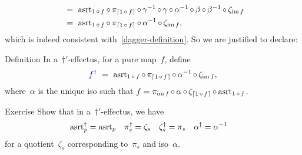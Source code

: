 \documentclass[b]{subfiles}
\begin{document}
\begin{parsec}
\begin{point}
\begin{align*}
    &\ = \ \mathrm{asrt}_{1 \mathop{\circ} f}\mathop{\circ} \pi_{\left\lceil1 \mathop{\circ} f\right\rceil}
                \mathop{\circ} \gamma^{-1} \mathop{\circ} \gamma \mathop{\circ} \alpha^{-1} \mathop{\circ} \beta 
                \mathop{\circ} \beta^{-1}\mathop{\circ} \zeta_{\operatorname{im} f} \\
    &\ = \ \mathrm{asrt}_{1 \mathop{\circ} f}\mathop{\circ} \pi_{\left\lceil1 \mathop{\circ} f\right\rceil}
                \mathop{\circ} \alpha^{-1} \mathop{\circ} \zeta_{\operatorname{im} f},
\end{align*}
which is indeed consistent with~\eqref{dagger-definition}.
So we are justified to declare:
\end{point}
\begin{point}{Definition}%
In a~$\dagger'$-effectus, for a pure map~$f$, define
\begin{equation*}
    \Define{f^\dagger}
        \ =\  \asrt_{1 \after f} \after
    \pi_{\ceil{1\after f}} \after
    \alpha^{-1} \after
    \zeta_{\IM f},
\end{equation*}
where~$\alpha$ is the unique iso such that
$f  =  \pi_{\operatorname{im} f} \mathop{\circ} \alpha \mathop{\circ} \zeta_{\left\lceil1\mathop{\circ} f\right\rceil}
            \mathop{\circ} \mathrm{asrt}_{1 \mathop{\circ} f}$.
\end{point}
\begin{point}{Exercise}%
Show that in a~$\dagger'$-effectus,
    we have
\begin{align*}
    \mathrm{asrt}_p^\dagger &= \mathrm{asrt}_p &
    \pi_s^\dagger &= \zeta_s &
    \zeta_s^\dagger &= \pi_s &
    \alpha^\dagger &= \alpha^{-1}
\end{align*}
for a quotient~$\zeta_s$ corresponding to~$\pi_s$
and iso~$\alpha$.
\end{point}
\end{parsec}
\end{document}
